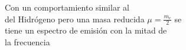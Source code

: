 \documentclass[preview]{standalone}
\begin{document}
\begin{center}
\begin{flushleft}
                      Con un comportamiento similar al \\del Hidrógeno
                      pero una masa reducida $\mu = \frac{m_e}{2}$ se \\
                      tiene un espectro de emisión con la mitad de \\
                      la frecuencia
                      \end{flushleft}
\end{center}
\end{document}
